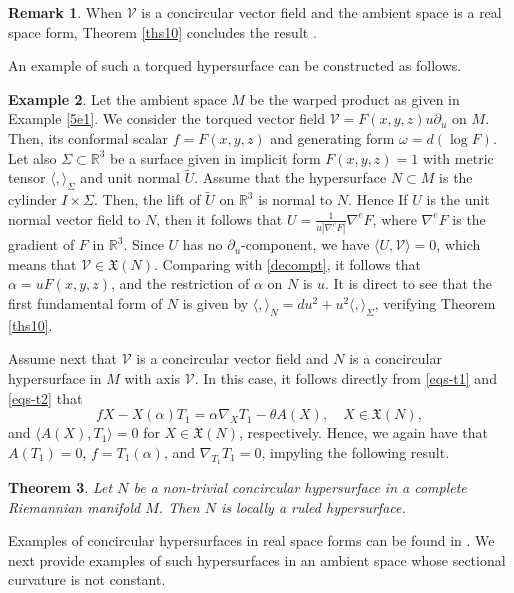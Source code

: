 \documentclass[12pt]{amsart}
\def\r{\mathbb R}
\def\v{\mathcal V}
\def\x{\mathfrak X}
\newtheorem{theorem}{Theorem}[section]
\theoremstyle{definition}
\newtheorem{example}[theorem]{Example}
\newtheorem{remark}[theorem]{Remark}
\begin{document}
\begin{remark}
When $\v$ is a concircular vector field and the ambient space is a real space form, Theorem \ref{ths10} concludes the result \cite[Proposition 7]{loy4}.
\end{remark}

An example of such a torqued hypersurface can be constructed as follows.

\begin{example}
Let the ambient space $M$ be the warped product as given in Example \ref{5e1}. We consider the torqued vector field  $\v=F(x,y,z)u\partial_u$ on $M$. Then, its conformal scalar $f=F(x,y,z)$ and generating form $\omega=d(\log F)$. Let also $\Sigma \subset \r^3$ be a surface given in implicit form $F(x,y,z)=1$ with metric tensor $\langle,\rangle_\Sigma$ and unit normal $\widetilde{U}$. Assume that the hypersurface $N\subset M$ is the cylinder $I\times \Sigma$. Then, the lift of $\widetilde{U}$ on $\r^3$ is normal to $N$. Hence If $U$ is the unit normal vector field to $N$, then it follows that $U=\frac{1}{u|\nabla^eF|}\nabla^eF$, where $\nabla^eF$ is the gradient of $F$ in $\r^3$. Since $U$ has no $\partial_u$-component, we have $\langle U,\v\rangle=0$, which means that $\v\in \x(N)$. Comparing with \eqref{decompt}, it follows that $\alpha=uF(x,y,z)$, and the restriction of $\alpha$ on $N$ is $u$. It is direct to see that the first fundamental form of $N$ is given by $\langle,\rangle_N=du^2+u^2\langle,\rangle_\Sigma$, verifying Theorem \ref{ths10}.
\end{example}

Assume next that $\v$ is a concircular vector field and $N$ is a concircular hypersurface in $M$ with axis $\v$. In this case, it follows directly from \eqref{eqs-t1} and \eqref{eqs-t2} that 
\begin{equation*}
fX- X(\alpha)T_1=\alpha\nabla_XT_1-\theta A(X), \quad X\in \x(N), 
\end{equation*}
and $\langle A(X),T_1\rangle=0$ for $X\in \x(N)$, respectively. Hence, we again have that $A(T_1)=0$, $f=T_1(\alpha)$, and $\nabla_{T_1}T_1=0$, impyling the following result.

\begin{theorem}\label{ths11}
Let $N$ be a non-trivial concircular hypersurface in a complete Riemannian manifold $M$. Then $N$ is locally a ruled hypersurface.
\end{theorem}

Examples of concircular hypersurfaces in real space forms can be found in \cite{loy4}. We next provide examples of such hypersurfaces in an ambient space whose sectional curvature is not constant.
\end{document}
